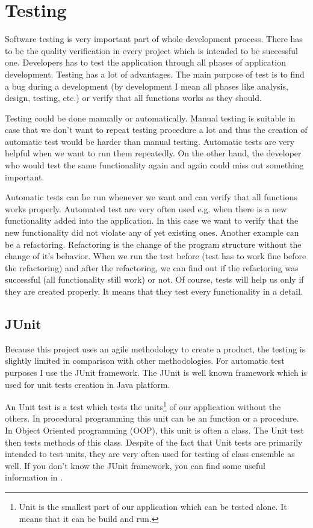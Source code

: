 \chapter{Testing}

Software testing is very important part of whole development process. There has to be the quality verification in every project which is intended to be successful one. Developers has to test the application through all phases of application development. Testing has a lot of advantages. The main purpose of test is to find a bug during a development (by development I mean all phases like analysis, design, testing, etc.) or verify that all functions works as they should. 

Testing could be done manually or automatically. Manual testing is suitable in case that we don't want to repeat testing procedure a lot and thus the creation of automatic test would be harder than manual testing. Automatic tests are very helpful when we want to run them repeatedly. On the other hand, the developer who would test the same functionality again and again could miss out something important.

Automatic tests can be run whenever we want and can verify that all functions works properly. Automated test are very often used e.g. when there is a new functionality added into the application. In this case we want to verify that the new functionality did not violate any of yet existing ones. Another example can be a refactoring. Refactoring is the change of the program structure without the change of it's behavior. When we run the test before (test has to work fine before the refactoring) and after the refactoring, we can find out if the refactoring was successful (all functionality still work) or not. Of course, tests will help us only if they are created properly. It means that they test every functionality in a detail.

\section{JUnit}

Because this project uses an agile methodology to create a product, the testing is slightly limited in comparison with other methodologies. For automatic test purposes I use the JUnit framework. The JUnit is well known framework which is used for unit tests creation in Java platform.

An Unit test is a test which tests the units\footnote{Unit is the smallest part of our application which can be tested alone. It means that it can be build and run.} of our application without the others. In procedural programming this unit can be an function or a procedure. In Object Oriented programming (OOP), this unit is often a class. The Unit test then tests methods of this class. Despite of the fact that Unit tests are primarily intended to test units, they are very often used for testing of class ensemble as well. If you don't know the JUnit framework, you can find some useful information in \cite{JUnitWeb}.

